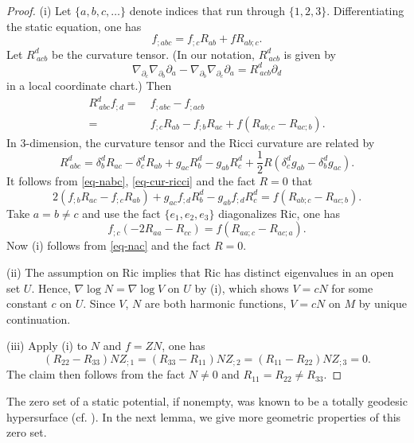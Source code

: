 \documentclass[12pt]{amsart}
\theoremstyle{remark}
\numberwithin{equation}{section}
\newcommand{\Ric}{\mbox{Ric}}
\newcommand{\be}{\begin{equation}}
\newcommand{\ee}{\end{equation}}
\def\p{\partial}
\begin{document}
\begin{proof}
(i) Let $ \{ a, b, c, \ldots \}$ denote indices that run through $ \{ 1, 2, 3 \}$. Differentiating the static equation, one has
$$ f_{; abc} = f_{;c} R_{ab} + f R_{ab;c} . $$
Let $ R^d_{ \ a c b} $ be the curvature tensor. (In our notation, $ R^d_{ \ a c b} $ is  given by
$$  \nabla_{\p_c} \nabla_{\p_b} \p_a - \nabla_{\p_b} \nabla_{\p_c}  \p_a = R_{ \ a c b}^d \p_d  $$
in a local coordinate chart.)
Then
\be \label{eq-nabc}
\begin{split}
 R_{\ abc}^d f_{;d} = & \ f_{;abc} - f_{;acb} \\
= & \ f_{;c} R_{ab} - f_{;b} R_{ac}  + f ( R_{ab;c} -   R_{ac;b}).
\end{split}
\ee
In $3$-dimension,  the curvature tensor and the Ricci curvature  are related by
\be \label{eq-cur-ricci}
 R^{d}_{\ abc} =
\delta^d_b R_{ac} - \delta^d_c R_{ab} + g_{ac}R^d_b - g_{ab} R^d_c
+ \frac{1}{2} R ( \delta^d_c g_{ab} - \delta^d_b g_{ac} ) .
\ee
It follows from \eqref{eq-nabc}, \eqref{eq-cur-ricci} and the fact $ R=0$ that
\be \label{eq-ricif}
 2 ( f_{;b}R_{ac} - f_{;c} R_{ab} ) + g_{ac} f_{;d} R^d_b - g_{ab} f_{;d} R^d_c  =    f ( R_{ab;c} -   R_{ac;b}).
\ee
Take $ a = b \neq c$ and use the fact $ \{ e_1, e_2, e_3 \}$ diagonalizes $ \Ric$,  one has
\be \label{eq-nac}
 f_{;c} ( - 2 R_{aa}   -  R_{cc})   =    f ( R_{aa;c} -   R_{ac;a}).
\ee
Now (i)  follows from \eqref{eq-nac} and the fact $ R = 0 $.

(ii)  The assumption on $ \Ric$ implies that $ \Ric$ has distinct eigenvalues in an open set $U$.  Hence,
$ \nabla \log N  = \nabla \log V $  on $U$ by (i), which shows $V = c N $ for some constant $c$ on $U$.  Since $V$, $N$ are both harmonic functions,
$V = c N$ on $M$ by unique continuation.

(iii)  Apply (i) to $N$ and $ f = Z N$, one has
$$  ( R_{22} - R_{33} ) N Z_{;1}  =
 ( R_{33} - R_{11} ) N Z_{;2}  =
 ( R_{11} - R_{22} ) N Z_{;3}  = 0 . $$
The claim then follows from the fact $N \neq 0 $ and $ R_{11}= R_{22} \neq R_{33} .$
\end{proof}

The zero set of a static potential, if nonempty, was known to be a totally geodesic
hypersurface (cf. \cite[Proposition 2.6]{Corvino}).
In the next lemma, we give  more  geometric
 properties of  this  zero set.
\end{document}
